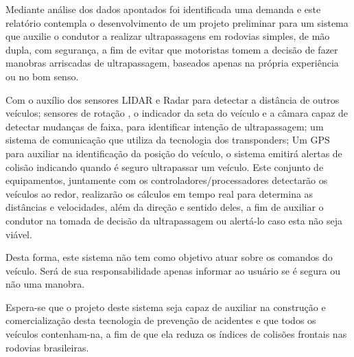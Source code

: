    Mediante análise dos dados apontados foi identificada uma demanda e este relatório
   contempla o desenvolvimento de um projeto preliminar para um sistema que auxilie o
   condutor a realizar ultrapassagens em rodovias simples, de mão dupla, com segurança,
	a fim de evitar que motoristas tomem a decisão de fazer manobras arriscadas
	de ultrapassagem, baseados apenas na própria experiência ou no bom senso.

	Com o auxílio dos sensores LIDAR e Radar para detectar a distância de outros
	veículos; sensores de rotação , o indicador da seta do veículo e a câmara
	capaz de detectar mudanças de faixa, para identificar intenção de ultrapassagem;
	um sistema de comunicação que utiliza da tecnologia dos transponders; Um GPS
	para auxiliar na identificação da posição do veículo, o sistema emitirá alertas
	de colisão indicando quando é seguro ultrapassar um veículo. Este conjunto
	de equipamentos, juntamente com os controladores/processadores detectarão os
	veículos ao redor, realizarão os cálculos em tempo real para determina as
	distâncias e velocidades, além da direção e sentido deles, a fim de auxiliar
	o condutor na tomada de decisão da ultrapassagem ou alertá-lo caso esta não
	seja viável.

	Desta forma, este sistema não tem como objetivo atuar sobre os comandos do
	 veículo. Será de sua responsabilidade apenas informar ao usuário se é
	segura ou não uma manobra.

Espera-se que o projeto deste sistema seja capaz de auxiliar na construção e
comercialização desta tecnologia de prevenção de acidentes e que todos os
veículos contenham-na, a fim de que ela reduza os índices de colisões
frontais nas rodovias brasileiras.
